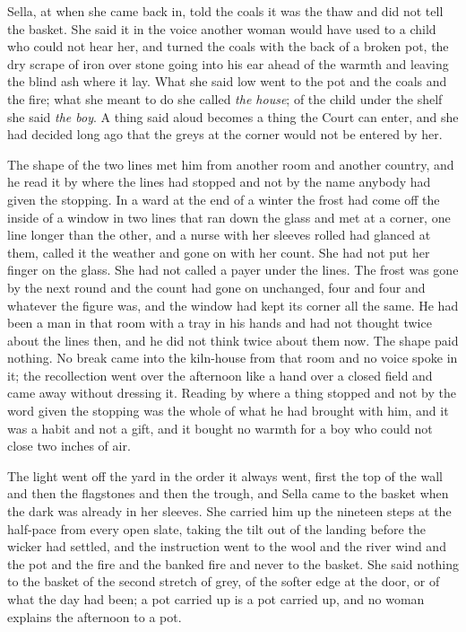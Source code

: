 \scenebreak

Sella, at  when she came back in, told the coals it was the thaw and did not tell the basket. She said it in the voice another woman would have used to a child who could not hear her, and turned the coals with the back of a broken pot, the dry scrape of iron over stone going into his ear ahead of the warmth and leaving the blind ash where it lay. What she said low went to the pot and the coals and the fire; what she meant to do she called \emph{the house}; of the child under the shelf she said \emph{the boy}. A thing said aloud becomes a thing the Court can enter, and she had decided long ago that the greys at the corner would not be entered by her.

The shape of the two lines met him from another room and another country, and he read it by where the lines had stopped and not by the name anybody had given the stopping. In a ward at the end of a winter the frost had come off the inside of a window in two lines that ran down the glass and met at a corner, one line longer than the other, and a nurse with her sleeves rolled had glanced at them, called it the weather and gone on with her count. She had not put her finger on the glass. She had not called a payer under the lines. The frost was gone by the next round and the count had gone on unchanged, four and four and whatever the figure was, and the window had kept its corner all the same. He had been a man in that room with a tray in his hands and had not thought twice about the lines then, and he did not think twice about them now. The shape paid nothing. No break came into the kiln-house from that room and no voice spoke in it; the recollection went over the afternoon like a hand over a closed field and came away without dressing it. Reading by where a thing stopped and not by the word given the stopping was the whole of what he had brought with him, and it was a habit and not a gift, and it bought no warmth for a boy who could not close two inches of air.

\scenebreak

The light went off the yard in the order it always went, first the top of the wall and then the flagstones and then the trough, and Sella came to the basket when the dark was already in her sleeves. She carried him up the nineteen steps at the half-pace from every open slate, taking the tilt out of the landing before the wicker had settled, and the instruction went to the wool and the river wind and the pot and the fire and the banked fire and never to the basket. She said nothing to the basket of the second stretch of grey, of the softer edge at the door, or of what the day had been; a pot carried up is a pot carried up, and no woman explains the afternoon to a pot.


